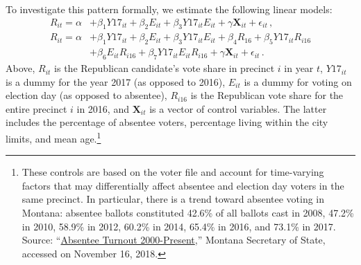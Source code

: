 \documentclass[letterpaper, 12pt]{article}
\begin{document}
\begin{raggedright}
To investigate this pattern formally, we estimate the following linear models:
\begin{align}
R_{it} = \alpha &+ \beta_1 Y17_{it} + \beta_2 E_{it} + \beta_3 Y17_{it} E_{it} + \gamma \textbf{X}_{it} + \epsilon_{it} \, , \label{eq:mt_main} \\
R_{it} = \alpha &+ \beta_1 Y17_{it} + \beta_2 E_{it} + \beta_3 Y17_{it} E_{it} + \beta_4 R_{16} + \beta_5 Y17_{it} R_{i16} \nonumber \\
& + \beta_6 E_{it} R_{i16} + \beta_7 Y17_{it} E_{it} R_{i16} + \gamma \textbf{X}_{it} + \epsilon_{it} \,. \label{eq:mt_hetero}
\end{align}
Above, $R_{it}$ is the Republican candidate's vote share in precinct $i$ in year $t$, $Y17_{it}$ is a dummy for the year 2017 (as opposed to 2016), $E_{it}$ is a dummy for voting on election day (as opposed to absentee), $R_{i16}$ is the Republican vote share for the entire precinct $i$ in 2016, and $\textbf{X}_{it}$ is a vector of control variables. The latter includes the percentage of absentee voters, percentage living within the city limits, and mean age.\footnote{These controls are based on the voter file and account for time-varying factors that may differentially affect absentee and election day voters in the same precinct. In particular, there is a trend toward absentee voting in Montana: absentee ballots constituted 42.6\% of all ballots cast in 2008, 47.2\% in 2010, 58.9\% in 2012, 60.2\% in 2014, 65.4\% in 2016, and 73.1\% in 2017. Source: ``\href{https://sosmt.gov/Portals/142/Elections/Documents/Absentee-Turnout-2000-Present.xlsx}{Absentee Turnout 2000-Present},'' Montana Secretary of State, accessed on November 16, 2018.}

\begin{table}[!tb]
\renewcommand{\arraystretch}{1.1}


\end{table}
\end{raggedright}
\end{document}
